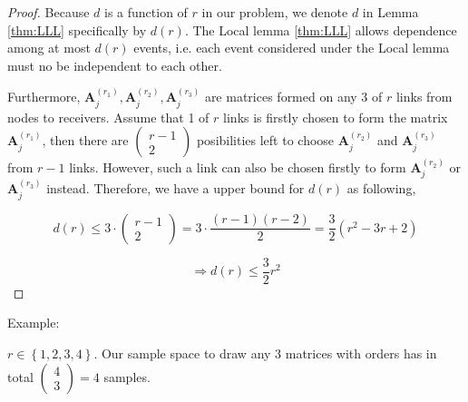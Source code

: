 \begin{proof}
Because $d$ is a function of $r$ in our problem, we denote $d$
in Lemma \ref{thm:LLL} specifically by $d(r)$. The Local lemma \ref{thm:LLL}
allows dependence among at most $d(r)$ events, i.e. each event considered
under the Local lemma must no be independent to each other.

Furthermore, $\boldsymbol{A}_{j}^{\left(r_{1}\right)},\boldsymbol{A}_{j}^{\left(r_{2}\right)},\boldsymbol{A}_{j}^{\left(r_{3}\right)}$
are matrices formed on any 3 of $r$ links from nodes to receivers.
Assume that 1 of $r$ links is firstly chosen to form the matrix $\boldsymbol{A}_{j}^{\left(r_{1}\right)}$,
then there are $\left(\begin{array}{c}
r-1\\
2
\end{array}\right)$ posibilities left to choose $\boldsymbol{A}_{j}^{\left(r_{2}\right)}$
and $\boldsymbol{A}_{j}^{\left(r_{3}\right)}$ from $r-1$ links.
However, such a link can also be chosen firstly to form $\boldsymbol{A}_{j}^{\left(r_{2}\right)}$
or $\boldsymbol{A}_{j}^{\left(r_{3}\right)}$ instead. Therefore,
we have a upper bound for $d(r)$ as following,

\[
d(r)\leq3\cdot\left(\begin{array}{c}
r-1\\
2
\end{array}\right)=3\cdot\frac{\left(r-1\right)\left(r-2\right)}{2}=\frac{3}{2}\left(r^{2}-3r+2\right)
\]

\[
\Rightarrow d(r)\leq\frac{3}{2}r^{2}
\]
\end{proof}
Example:

$r\in\left\{ 1,2,3,4\right\} $. Our sample space to draw any 3 matrices
with orders has in total $\left(\begin{array}{c}
4\\
3
\end{array}\right)=4$ samples.

